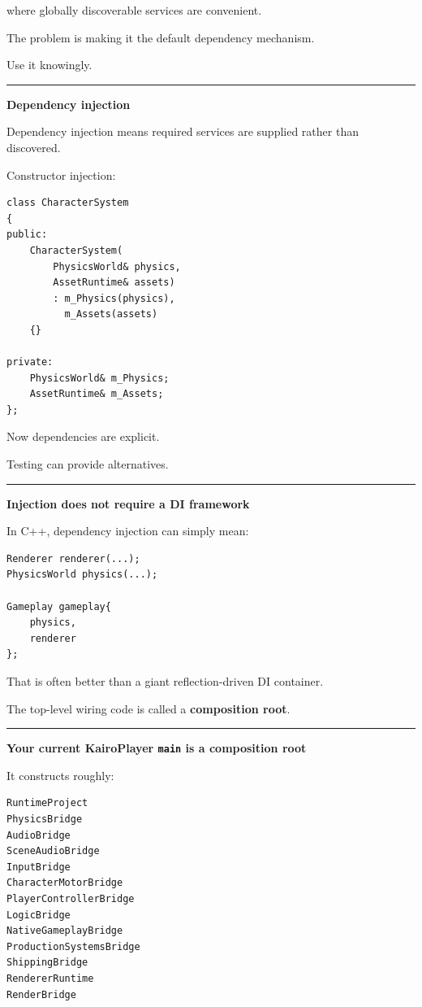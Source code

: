 where globally discoverable services are convenient.

The problem is making it the default dependency mechanism.

Use it knowingly.

\begin{center}\rule{0.5\linewidth}{0.5pt}\end{center}

\textbf{Dependency injection}

Dependency injection means required services are supplied rather than discovered.

Constructor injection:

\begin{verbatim}
class CharacterSystem
{
public:
    CharacterSystem(
        PhysicsWorld& physics,
        AssetRuntime& assets)
        : m_Physics(physics),
          m_Assets(assets)
    {}

private:
    PhysicsWorld& m_Physics;
    AssetRuntime& m_Assets;
};
\end{verbatim}

Now dependencies are explicit.

Testing can provide alternatives.

\begin{center}\rule{0.5\linewidth}{0.5pt}\end{center}

\textbf{Injection does not require a DI framework}

In C++, dependency injection can simply mean:

\begin{verbatim}
Renderer renderer(...);
PhysicsWorld physics(...);

Gameplay gameplay{
    physics,
    renderer
};
\end{verbatim}

That is often better than a giant reflection-driven DI container.

The top-level wiring code is called a \textbf{composition root}.

\begin{center}\rule{0.5\linewidth}{0.5pt}\end{center}

\textbf{Your current KairoPlayer \texttt{main} is a composition root}

It constructs roughly:

\begin{verbatim}
RuntimeProject
PhysicsBridge
AudioBridge
SceneAudioBridge
InputBridge
CharacterMotorBridge
PlayerControllerBridge
LogicBridge
NativeGameplayBridge
ProductionSystemsBridge
ShippingBridge
RendererRuntime
RenderBridge
\end{verbatim}

